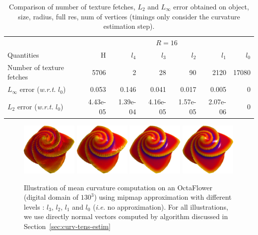\documentclass{llncs}
\newcommand{\ie}{\emph{i.e.} }
\newcommand{\wrt}{\emph{w.r.t.} }
\begin{document}
\begin{table}
\begin{center}
	\begin{tabular}{@{}lrrrrrr@{}}
      \toprule
      & \multicolumn{6}{c}{$R=16$}\\
      \cmidrule(r){2-7}
    Quantities & ~~~H & $l_4$ & $l_3$ & $l_2$ & $l_1$ & $l_0$\\
      \midrule
      Number of texture fetches &
      5706 & 2 & 28 & 90 & 2120 & 17080\\
      $L_\infty$ error (\wrt $l_0$) &
      0.053 & 0.146 & 0.041 & 0.017 & 0.005 & 0\\
      $L_2$ error (\wrt $l_0$) &
      4.43e-05 & 1.39e-04 & 4.16e-05 & 1.57e-05 & 2.07e-06 & 0\\
      \bottomrule
    \end{tabular}

  \end{center}
  \caption{Comparison of number of texture fetches, $L_2$ and $L_\infty$ error obtained on  object, size, radius, full res, num of vertices (timings
    only consider the curvature estimation step).\label{tab:full-res-stat}}
\end{table}

\begin{figure}[!htbp]
  \begin{center}
   {\includegraphics[width=2.7cm]{figs/octa_r10_l3_a}}
   {\includegraphics[width=2.7cm]{figs/octa_r10_l2_a}}
   {\includegraphics[width=2.7cm]{figs/octa_r10_l1_a}}
   {\includegraphics[width=2.7cm]{figs/octa_r10_l0_a}}
  \end{center}
  \caption{Illustration of mean curvature computation on an OctaFlower (digital domain of $130^3$) using mipmap approximation with different levels : $l_3$, $l_2$, $l_1$ and $l_0$ (\ie no approximation).
  For all illustrations, we use directly normal vectors computed by algorithm discussed in Section~\ref{sec:curv-tens-estim}}
  \label{fig:refine}
\end{figure}
\end{document}
